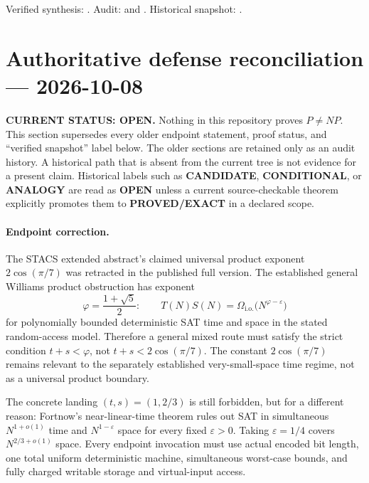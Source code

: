 \documentclass[11pt]{article}
\begin{document}
Verified synthesis:
.
Audit:
 and
.
Historical snapshot:
.

\clearpage


\section{Authoritative defense reconciliation --- 2026-10-08}

\begin{warningbox}
\textbf{CURRENT STATUS: OPEN.}  Nothing in this repository proves
$P\ne NP$.  This section supersedes every older endpoint statement, proof
status, and ``verified snapshot'' label below.  The older sections are retained
only as an audit history.  A historical path that is absent from the current
tree is not evidence for a present claim.  Historical labels such as
\textbf{CANDIDATE}, \textbf{CONDITIONAL}, or \textbf{ANALOGY} are read as
\textbf{OPEN} unless a current source-checkable theorem explicitly promotes
them to \textbf{PROVED/EXACT} in a declared scope.
\end{warningbox}

\paragraph{Endpoint correction.}
The STACS extended abstract's claimed universal product exponent
$2\cos(\pi/7)$ was retracted in the published full version.  The established
general Williams product obstruction has exponent
\[
 \varphi=\frac{1+\sqrt5}{2}:
 \qquad T(N)S(N)=\Omega_{\mathrm{i.o.}}
       \bigl(N^{\varphi-\varepsilon}\bigr)
\]
for polynomially bounded deterministic SAT time and space in the stated
random-access model.  Therefore a general mixed route must satisfy the strict
condition $t+s<\varphi$, not $t+s<2\cos(\pi/7)$.  The constant
$2\cos(\pi/7)$ remains relevant to the separately established very-small-space
time regime, not as a universal product boundary.

The concrete landing $(t,s)=(1,2/3)$ is still forbidden, but for a different
reason: Fortnow's near-linear-time theorem rules out SAT in simultaneous
$N^{1+o(1)}$ time and $N^{1-\varepsilon}$ space for every fixed
$\varepsilon>0$.  Taking $\varepsilon=1/4$ covers
$N^{2/3+o(1)}$ space.  Every endpoint invocation must use actual encoded bit
length, one total uniform deterministic machine, simultaneous worst-case
bounds, and fully charged writable storage and virtual-input access.
\end{document}
